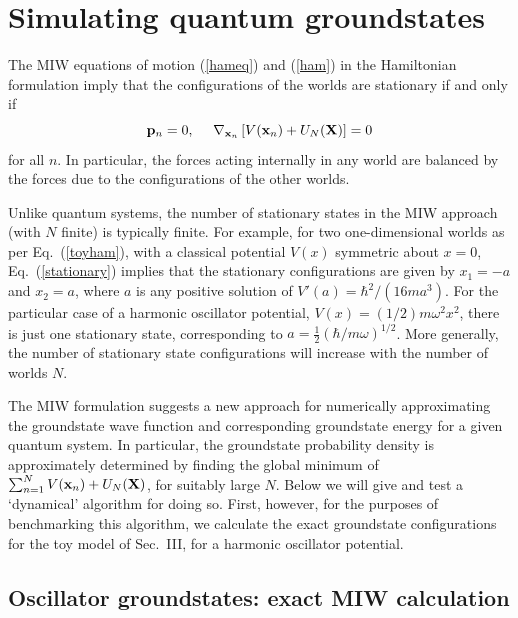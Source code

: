 \documentclass[twocolumn,aps,pra,amsmath,amssymb,superscriptaddress]{revtex4}
\renewcommand{\(}{\left(}
\renewcommand{\)}{\right)}
\newcommand{\blk}{\color{black}}
\begin{document}
\section{Simulating quantum groundstates}\label{sec:groundstates}

The MIW equations of motion (\ref{hameq}) and (\ref{ham}) in the Hamiltonian formulation imply that the configurations of the worlds are stationary if and only if
\begin{equation} \label{stationary}
{\bf p}_n = 0,~~~~\nabla_{{\bf x}_n} \left[ V({\bf x}_n) + U_N({\bf X})\right]  = 0 
\end{equation}
for all $n$.  In particular, the forces acting internally in any world are balanced by the forces due to the configurations of the other worlds.

Unlike quantum systems, the number of stationary states in the MIW approach
(with $N$ finite) \blk is typically finite.  For example, for two
one-dimensional worlds as per Eq.~(\ref{toyham}), with a classical potential
$V(x)$ symmetric about $x=0$, Eq.~(\ref{stationary}) implies that the stationary
configurations are given by  $x_1=-a$ and $x_2=a$, where $a$ is any positive
solution of $V'(a)=\hbar^2/(16ma^3)$.  For the particular case of a harmonic
oscillator potential, $V(x)=(1/2)m\omega^2 x^2$, there is \blk just one
stationary state, corresponding to $a=\frac{1}{2} (\hbar/m\omega)^{1/2}$.  More
generally, the number of stationary state configurations will increase with the
number of worlds $N$.

The MIW formulation suggests a new approach for numerically approximating the
groundstate wave function and corresponding groundstate energy for a given
quantum system.  In particular, the groundstate probability density is
approximately determined by finding the global minimum of $\sum_{n=1}^N V({\bf
x}_n) + U_N({\bf X})$, for suitably large $N$.  Below we will give and test a
`dynamical' algorithm for doing so.  First, however, for the purposes of benchmarking
this algorithm, we calculate the exact groundstate configurations for the
 toy model of Sec.~III, for a harmonic oscillator potential.

\subsection{Oscillator groundstates: exact MIW calculation}
\end{document}

